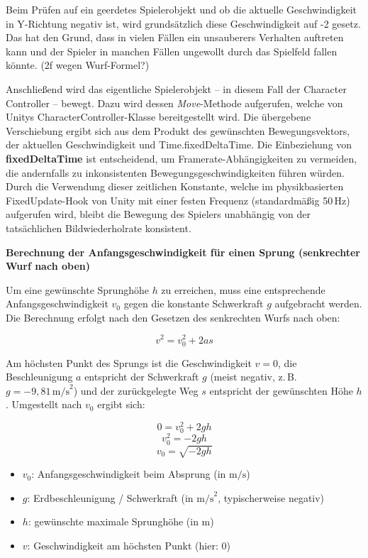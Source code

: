 

Beim Prüfen auf ein geerdetes Spielerobjekt und ob die aktuelle Geschwindigkeit in Y-Richtung negativ ist, wird grundsätzlich diese Geschwindigkeit auf -2 gesetz. Das hat den Grund, dass in vielen Fällen ein unsauberers Verhalten auftreten kann und der Spieler in manchen Fällen ungewollt durch das Spielfeld fallen könnte.
(2f wegen Wurf-Formel?)

Anschließend wird das eigentliche Spielerobjekt – in diesem Fall der Character Controller – bewegt. Dazu wird dessen \textit{Move}-Methode aufgerufen, welche von Unitys CharacterController-Klasse bereitgestellt wird. Die übergebene Verschiebung ergibt sich aus dem Produkt des gewünschten Bewegungsvektors, der aktuellen Geschwindigkeit und Time.fixedDeltaTime. Die Einbeziehung von \textbf{fixedDeltaTime} ist entscheidend, um Framerate-Abhängigkeiten zu vermeiden, die andernfalls zu inkonsistenten Bewegungsgeschwindigkeiten führen würden. Durch die Verwendung dieser zeitlichen Konstante, welche im physikbasierten FixedUpdate-Hook von Unity mit einer festen Frequenz (standardmäßig 50\,Hz) aufgerufen wird, bleibt die Bewegung des Spielers unabhängig von der tatsächlichen Bildwiederholrate konsistent.

\textbf{Berechnung der Anfangsgeschwindigkeit für einen Sprung (senkrechter Wurf nach oben)}

Um eine gewünschte Sprunghöhe $h$ zu erreichen, muss eine entsprechende Anfangsgeschwindigkeit $v_0$ gegen die konstante Schwerkraft $g$ aufgebracht werden. Die Berechnung erfolgt nach den Gesetzen des senkrechten Wurfs nach oben:

\[
v^2 = v_0^2 + 2 a s
\]

Am höchsten Punkt des Sprungs ist die Geschwindigkeit $v = 0$, die Beschleunigung $a$ entspricht der Schwerkraft $g$ (meist negativ, z.\,B. $g = -9{,}81\,\text{m/s}^2$) und der zurückgelegte Weg $s$ entspricht der gewünschten Höhe $h$. Umgestellt nach $v_0$ ergibt sich:

\[
0 = v_0^2 + 2 g h
\]
\[
v_0^2 = -2 g h
\]
\[
v_0 = \sqrt{ -2 g h }
\]

\begin{itemize}
    \item $v_0$: Anfangsgeschwindigkeit beim Absprung (in $\text{m/s}$)
    \item $g$: Erdbeschleunigung / Schwerkraft (in $\text{m/s}^2$, typischerweise negativ)
    \item $h$: gewünschte maximale Sprunghöhe (in $\text{m}$)
    \item $v$: Geschwindigkeit am höchsten Punkt (hier: $0$)
\end{itemize}

